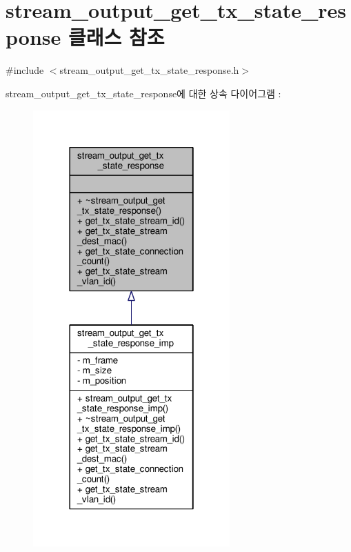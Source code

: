 \hypertarget{classavdecc__lib_1_1stream__output__get__tx__state__response}{}\section{stream\+\_\+output\+\_\+get\+\_\+tx\+\_\+state\+\_\+response 클래스 참조}
\label{classavdecc__lib_1_1stream__output__get__tx__state__response}


{\ttfamily \#include $<$stream\+\_\+output\+\_\+get\+\_\+tx\+\_\+state\+\_\+response.\+h$>$}



stream\+\_\+output\+\_\+get\+\_\+tx\+\_\+state\+\_\+response에 대한 상속 다이어그램 \+: 
\nopagebreak
\begin{figure}[H]
\begin{center}
\leavevmode
\includegraphics[width=214pt]{classavdecc__lib_1_1stream__output__get__tx__state__response__inherit__graph}
\end{center}
\end{figure}


